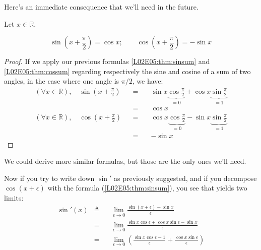 \documentclass[solutions.tex]{subfiles}
\begin{document}
Here's an immediate consequence that we'll need in the future.
\begin{theorem}
Let $x\in\mathbb{R}$.

\[
	\boxed{\sin(x+\frac\pi2) = \cos x;\qquad
	\cos(x+\frac\pi2) = -\sin x}
	\label{L02E05:thm:trig-shift}
\]

\end{theorem}
\begin{proof}
If we apply our previous formulas \eqref{L02E05:thm:sinsum} and
\eqref{L02E05:thm:cossum} regarding respectively the sine and
cosine of a sum of two angles, in the case where one angle is
$\pi/2$, we have:
\begin{equation*} \begin{aligned}
	(\forall x\in\mathbb{R}),\quad \sin(x+\frac{\pi}2) &&=\quad&
		\sin x\underbrace{\cos\frac{\pi}{2}}_{=0}
		+\cos x\underbrace{\sin \frac{\pi}{2}}_{=1} \\
	~ &&=\quad& \boxed{\cos x} \\
	(\forall x\in\mathbb{R}),\quad \cos(x+\frac{\pi}2) &&=\quad&
		\cos x\underbrace{\cos\frac{\pi}{2}}_{=0}
		-\sin x\underbrace{\sin \frac{\pi}{2}}_{=1} \\
	~ &&=\quad& \boxed{-\sin x}
\end{aligned} \end{equation*}
\end{proof}
\begin{remark} We could derive more similar formulas, but
those are the only ones we'll need.
\end{remark}

\hrr

Now if you try to write down $\sin'$ as previously suggested,
and if you decompose $\cos(x+\epsilon)$ with the formula
(\ref{L02E05:thm:sinsum}), you see that yields two limits:
\begin{equation*} \begin{aligned}
	\sin'(x) &\triangleq&& \lim_{\epsilon \rightarrow 0}
		\frac{\sin(x+\epsilon)-\sin x}{\epsilon} \\
	~ &=&& \lim_{\epsilon \rightarrow 0}
		\frac{\sin x\cos\epsilon+\cos x\sin\epsilon-\sin x}{\epsilon} \\
	~ &=&& \lim_{\epsilon \rightarrow 0}\left(
		\frac{\sin x\cos\epsilon-1}{\epsilon}+\frac{\cos x\sin\epsilon}{\epsilon}
		\right) \\
\end{aligned} \end{equation*}
\end{document}
